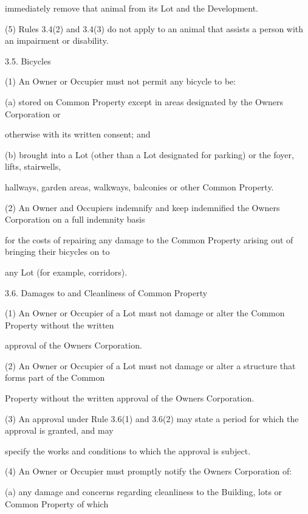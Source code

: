 \documentclass{article}
\begin{document}
{\fontsize{10.02}{1}immediately remove that animal from its Lot and the Development. }

{\fontsize{9.962}{1}(5) Rules 3.4(2) and 3.4(3) do not apply to an animal that assists a person with an impairment or disability. }

{\fontsize{9.99}{1}3.5. Bicycles }

{\fontsize{9.962}{1}(1) An Owner or Occupier must not permit any bicycle to be: }

{\fontsize{9.962}{1}(a) stored on Common Property except in areas designated by the Owners Corporation or }

{\fontsize{10.02}{1}otherwise with its written consent; and }

{\fontsize{9.962}{1}(b) brought into a Lot (other than a Lot designated for parking) or the foyer, lifts, stairwells, }

{\fontsize{10.02}{1}hallways, garden areas, walkways, balconies or other Common Property. }

{\fontsize{9.962}{1}(2) An Owner and Occupiers indemnify and keep indemnified the Owners Corporation on a full indemnity basis }

{\fontsize{10.02}{1}for the costs of repairing any damage to the Common Property arising out of bringing their bicycles on to }

{\fontsize{10.02}{1}any Lot (for example, corridors). }

{\fontsize{9.99}{1}3.6. Damages to and Cleanliness of Common Property }

{\fontsize{9.962}{1}(1) An Owner or Occupier of a Lot must not damage or alter the Common Property without the written }

{\fontsize{10.02}{1}approval of the Owners Corporation. }

{\fontsize{9.962}{1}(2) An Owner or Occupier of a Lot must not damage or alter a structure that forms part of the Common }

{\fontsize{10.02}{1}Property without the written approval of the Owners Corporation. }

{\fontsize{9.962}{1}(3) An approval under Rule 3.6(1) and 3.6(2) may state a period for which the approval is granted, and may }

{\fontsize{10.02}{1}specify the works and conditions to which the approval is subject. }

{\fontsize{9.962}{1}(4) An Owner or Occupier must promptly notify the Owners Corporation of: }

{\fontsize{9.962}{1}(a) any damage and concerns regarding cleanliness to the Building, lots or Common Property of which }
\end{document}
